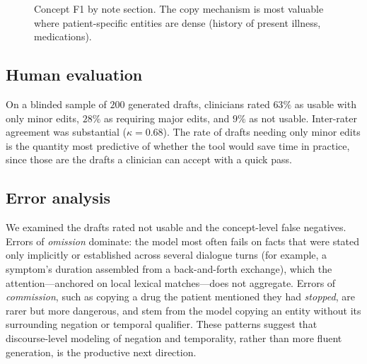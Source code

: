 \documentclass{article}
\begin{document}
\begin{figure}[t]
\centering
{}
\caption{Concept F1 by note section. The copy mechanism is most valuable where
patient-specific entities are dense (history of present illness, medications).}
\label{fig:bysection}
\end{figure}

\subsection{Human evaluation}

On a blinded sample of $200$ generated drafts, clinicians rated $63\%$ as usable with
only minor edits, $28\%$ as requiring major edits, and $9\%$ as not usable.
Inter-rater agreement was substantial ($\kappa = 0.68$). The rate of drafts needing
only minor edits is the quantity most predictive of whether the tool would save time
in practice, since those are the drafts a clinician can accept with a quick pass.

\subsection{Error analysis}

We examined the drafts rated not usable and the concept-level false negatives. Errors
of \emph{omission} dominate: the model most often fails on facts that were stated only
implicitly or established across several dialogue turns (for example, a symptom's
duration assembled from a back-and-forth exchange), which the attention---anchored on
local lexical matches---does not aggregate. Errors of \emph{commission}, such as
copying a drug the patient mentioned they had \emph{stopped}, are rarer but more
dangerous, and stem from the model copying an entity without its surrounding
negation or temporal qualifier. These patterns suggest that discourse-level modeling
of negation and temporality, rather than more fluent generation, is the productive
next direction.
\end{document}
